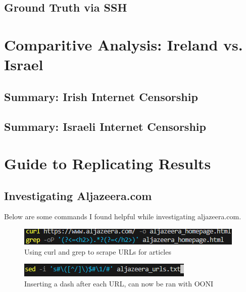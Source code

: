 \subsection{Ground Truth via SSH}

\section{Comparitive Analysis: Ireland vs. Israel}
\subsection{Summary: Irish Internet Censorship}
\subsection{Summary: Israeli Internet Censorship}
\subsection{}

\section{Guide to Replicating Results}

\subsection{Investigating Aljazeera.com}
Below are some commands I found helpful while investigating aljazeera.com.

\begin{figure}[H]
    \centering
    \includegraphics[width=1\linewidth]{AljazeeraURLs1.png}
    \caption{Using curl and grep to scrape URLs for articles}
    \label{fig:enter-label}
\end{figure}

\begin{figure}[H]
    \centering
\includegraphics[width=1\linewidth]{AljazeeraComs2.png}
    \caption{Inserting a dash after each URL, can now be ran with OONI}
    \label{fig:enter-label}
\end{figure}


